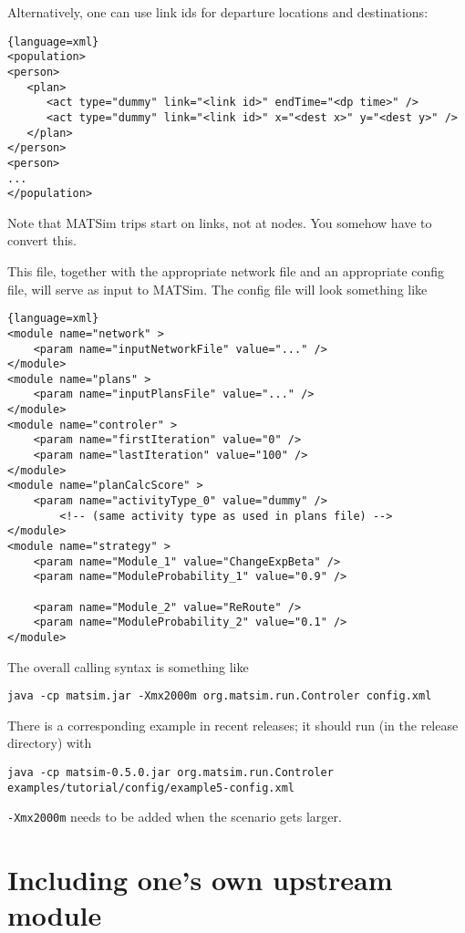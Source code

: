 Alternatively, one can use link ids for departure locations and destinations:
\begin{lstlisting}{language=xml}
<population>
<person>
   <plan>
      <act type="dummy" link="<link id>" endTime="<dp time>" />
      <act type="dummy" link="<link id>" x="<dest x>" y="<dest y>" />
   </plan>
</person>
<person>
...
</population>
\end{lstlisting}

Note that MATSim trips start on links, not at nodes.  You somehow have to convert this.

This file, together with the appropriate network file and an appropriate config file, will serve as input to MATSim.  The config file will look something like
\begin{lstlisting}{language=xml}
<module name="network" >
	<param name="inputNetworkFile" value="..." /> 
</module>
<module name="plans" >
	<param name="inputPlansFile" value="..." />
</module>
<module name="controler" >
	<param name="firstIteration" value="0" />
	<param name="lastIteration" value="100" />
</module>
<module name="planCalcScore" >
	<param name="activityType_0" value="dummy" />
        <!-- (same activity type as used in plans file) -->
</module>
<module name="strategy" >
	<param name="Module_1" value="ChangeExpBeta" />
	<param name="ModuleProbability_1" value="0.9" />

	<param name="Module_2" value="ReRoute" />
	<param name="ModuleProbability_2" value="0.1" />
</module>
\end{lstlisting}

The overall calling syntax is something like
\begin{lstlisting}
java -cp matsim.jar -Xmx2000m org.matsim.run.Controler config.xml 
\end{lstlisting}

There is a corresponding example in recent releases; it should run (in the release directory) with 
\begin{lstlisting}
java -cp matsim-0.5.0.jar org.matsim.run.Controler examples/tutorial/config/example5-config.xml
\end{lstlisting}
\verb$-Xmx2000m$ needs to be added when the scenario gets larger.

\section{Including one's own upstream module}
\label{sec:including-ones-own}

